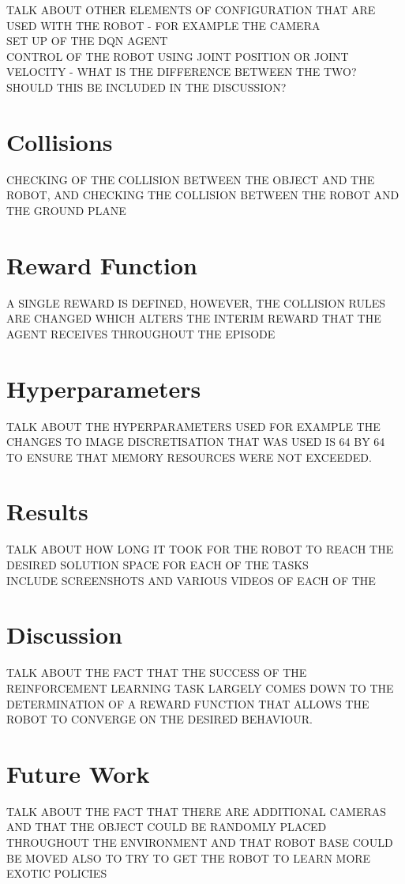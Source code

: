 \documentclass[a4paper]{article}
\begin{document}
TALK ABOUT OTHER ELEMENTS OF CONFIGURATION THAT ARE USED WITH THE ROBOT - FOR EXAMPLE THE CAMERA\\

SET UP OF THE DQN AGENT\\

CONTROL OF THE ROBOT USING JOINT POSITION OR JOINT VELOCITY - WHAT IS THE DIFFERENCE BETWEEN THE TWO? SHOULD THIS BE INCLUDED IN THE DISCUSSION?\\



\section{Collisions}
CHECKING OF THE COLLISION BETWEEN THE OBJECT AND THE ROBOT, AND CHECKING THE COLLISION BETWEEN THE ROBOT AND THE GROUND PLANE



\section{Reward Function}
A SINGLE REWARD IS DEFINED, HOWEVER, THE COLLISION RULES ARE CHANGED WHICH ALTERS THE INTERIM REWARD THAT THE AGENT RECEIVES THROUGHOUT THE EPISODE



\section{Hyperparameters}
TALK ABOUT THE HYPERPARAMETERS USED FOR EXAMPLE THE CHANGES TO IMAGE DISCRETISATION THAT WAS USED IS 64 BY 64 TO ENSURE THAT MEMORY RESOURCES WERE NOT EXCEEDED.


\section{Results}
TALK ABOUT HOW LONG IT TOOK FOR THE ROBOT TO REACH THE DESIRED SOLUTION SPACE FOR EACH OF THE TASKS\\

INCLUDE SCREENSHOTS AND VARIOUS VIDEOS OF EACH OF THE 


\section{Discussion}
TALK ABOUT THE FACT THAT THE SUCCESS OF THE REINFORCEMENT LEARNING TASK LARGELY COMES DOWN TO THE DETERMINATION OF A REWARD FUNCTION THAT ALLOWS THE ROBOT TO CONVERGE ON THE DESIRED BEHAVIOUR.

\section{Future Work}
TALK ABOUT THE FACT THAT THERE ARE ADDITIONAL CAMERAS AND THAT THE OBJECT COULD BE RANDOMLY PLACED THROUGHOUT THE ENVIRONMENT AND THAT ROBOT BASE COULD BE MOVED ALSO TO TRY TO GET THE ROBOT TO LEARN MORE EXOTIC POLICIES



\end{document}

